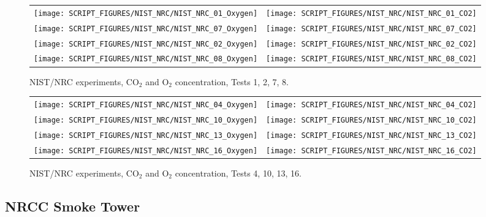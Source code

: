 \begin{figure}[p]
\begin{tabular*}{\textwidth}{l@{\extracolsep{\fill}}r}
\texttt{[image: SCRIPT\_FIGURES/NIST\_NRC/NIST\_NRC\_01\_Oxygen]} &
\texttt{[image: SCRIPT\_FIGURES/NIST\_NRC/NIST\_NRC\_01\_CO2]} \\
\texttt{[image: SCRIPT\_FIGURES/NIST\_NRC/NIST\_NRC\_07\_Oxygen]} &
\texttt{[image: SCRIPT\_FIGURES/NIST\_NRC/NIST\_NRC\_07\_CO2]} \\
\texttt{[image: SCRIPT\_FIGURES/NIST\_NRC/NIST\_NRC\_02\_Oxygen]} &
\texttt{[image: SCRIPT\_FIGURES/NIST\_NRC/NIST\_NRC\_02\_CO2]} \\
\texttt{[image: SCRIPT\_FIGURES/NIST\_NRC/NIST\_NRC\_08\_Oxygen]} &
\texttt{[image: SCRIPT\_FIGURES/NIST\_NRC/NIST\_NRC\_08\_CO2]}
\end{tabular*}
\caption[NIST/NRC experiments, CO$_2$ and O$_2$ concentration, Tests 1, 2, 7, 8]{NIST/NRC experiments, CO$_2$ and O$_2$ concentration, Tests 1, 2, 7, 8.}
\label{NIST_NRC_Gas_Closed_1}
\end{figure}

\begin{figure}[p]
\begin{tabular*}{\textwidth}{l@{\extracolsep{\fill}}r}
\texttt{[image: SCRIPT\_FIGURES/NIST\_NRC/NIST\_NRC\_04\_Oxygen]} &
\texttt{[image: SCRIPT\_FIGURES/NIST\_NRC/NIST\_NRC\_04\_CO2]} \\
\texttt{[image: SCRIPT\_FIGURES/NIST\_NRC/NIST\_NRC\_10\_Oxygen]} &
\texttt{[image: SCRIPT\_FIGURES/NIST\_NRC/NIST\_NRC\_10\_CO2]} \\
\texttt{[image: SCRIPT\_FIGURES/NIST\_NRC/NIST\_NRC\_13\_Oxygen]} &
\texttt{[image: SCRIPT\_FIGURES/NIST\_NRC/NIST\_NRC\_13\_CO2]} \\
\texttt{[image: SCRIPT\_FIGURES/NIST\_NRC/NIST\_NRC\_16\_Oxygen]} &
\texttt{[image: SCRIPT\_FIGURES/NIST\_NRC/NIST\_NRC\_16\_CO2]}
\end{tabular*}
\caption[NIST/NRC experiments, CO$_2$ and O$_2$ concentration, Tests 4, 10, 13, 16]{NIST/NRC experiments, CO$_2$ and O$_2$ concentration, Tests 4, 10, 13, 16.}
\label{NIST_NRC_Gas_Closed_2}
\end{figure}


\clearpage

\subsection{NRCC Smoke Tower}

